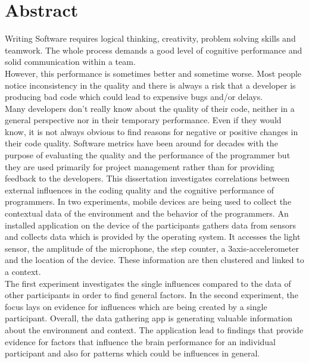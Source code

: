 \section*{Abstract}

Writing Software requires logical thinking, creativity, problem solving skills and teamwork. The whole process demands a good level of cognitive performance and solid communication within a team.\\
However, this performance is sometimes better and sometime worse. Most people notice inconsistency in the quality and there is always a risk that a developer is producing bad code which could lead to expensive bugs and/or delays.\\
Many developers don't really know about the quality of their code, neither in a general perspective nor in their temporary performance. Even if they would know, it is not always obvious to find reasons for negative or positive changes in their code quality.
Software metrics have been around for decades with the purpose of evaluating the quality and the performance of the programmer but they are used primarily for project management rather than for providing feedback to the developers. 
\bigbreak
This dissertation investigates correlations between external influences in the coding quality and the cognitive performance of programmers. 
In two experiments, mobile devices are being used to collect the contextual data of the environment and the behavior of the programmers. 
An installed application on the device of the participants gathers data from sensors and collects data which is provided by the operating system. It accesses the light sensor, the amplitude of the microphone, the step counter, a 3axis-accelerometer and the location of the device. These information are then clustered and linked to a context.\\
The first experiment investigates the single influences compared to the data of other participants in order to find general factors. In the second experiment, the focus lays on evidence for influences which are being created by a single participant. 
\bigbreak
Overall, the data gathering app is generating valuable information about the environment and context. 
The application lead to findings that provide evidence for factors that influence the brain performance for an individual participant and also for patterns which could be influences in general. 

